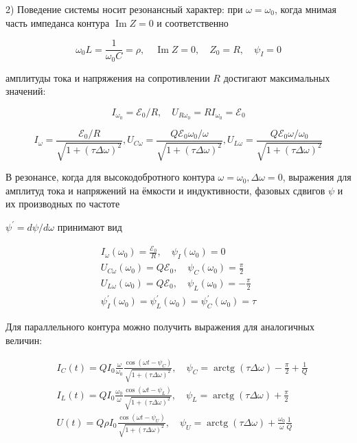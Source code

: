 \documentclass[a4paper, 12pt]{article}%
\begin{document}
2) Поведение системы носит резонансный характер: при $\omega=\omega_{0}$, когда мнимая часть импеданса контура $\operatorname{Im} Z=0$ и соответственно

\[
\omega_{0} L=\frac{1}{\omega_{0} C}=\rho, \quad \operatorname{Im} Z=0, \quad Z_{0}=R, \quad \psi_{I}=0
\]

амплитуды тока и напряжения на сопротивлении $R$ достигают максимальных значений:

\[
I_{\omega_{0}}=\mathcal{E}_{0} / R, \quad U_{R \omega_{0}}=R I_{\omega_{0}}=\mathcal{E}_{0}
\]

\[
I_{\omega}=\frac{\mathcal{E}_{0} / R}{\sqrt{1+(\tau \Delta \omega)^{2}}}, U_{C \omega}=\frac{Q \mathcal{E}_{0} \omega_{0} / \omega}{\sqrt{1+(\tau \Delta \omega)^{2}}}, U_{L \omega}=\frac{Q \mathcal{E}_{0} \omega / \omega_{0}}{\sqrt{1+(\tau \Delta \omega)^{2}}}
\]

В резонансе, когда для высокодобротного контура $\omega=\omega_{0}, \Delta \omega=0$, выражения для амплитуд тока и напряжений на ёмкости и индуктивности, фазовых сдвигов $\psi$ и их производных по частоте 

$\psi^{\prime}=d \psi / d \omega$ принимают вид

\[
\begin{gathered}
I_{\omega}\left(\omega_{0}\right)=\frac{\mathcal{E}_{0}}{R}, \quad \psi_{I}\left(\omega_{0}\right)=0 \\
U_{C \omega}\left(\omega_{0}\right)=Q \mathcal{E}_{0}, \quad \psi_{C}\left(\omega_{0}\right)=\frac{\pi}{2} \\
U_{L \omega}\left(\omega_{0}\right)=Q \mathcal{E}_{0}, \quad \psi_{L}\left(\omega_{0}\right)=-\frac{\pi}{2} \\
\psi_{I}^{\prime}\left(\omega_{0}\right)=\psi_{L}^{\prime}\left(\omega_{0}\right)=\psi_{C}^{\prime}\left(\omega_{0}\right)=\tau
\end{gathered}
\]

Для параллельного контура можно получить выражения для аналогичных величин:

\[
\begin{aligned}
&I_{C}(t)=Q I_{0} \frac{\omega}{\omega_{0}} \frac{\cos \left(\omega t-\psi_{C}\right)}{\sqrt{1+(\tau \Delta \omega)^{2}}}, \quad \psi_{C}=\operatorname{arctg}(\tau \Delta \omega)-\frac{\pi}{2}+\frac{1}{Q} \\
&I_{L}(t)=Q I_{0} \frac{\omega_{0}}{\omega} \frac{\cos \left(\omega t-\psi_{L}\right)}{\sqrt{1+(\tau \Delta \omega)^{2}}}, \quad \psi_{L}=\operatorname{arctg}(\tau \Delta \omega)+\frac{\pi}{2} \\
&U(t)=Q \rho I_{0} \frac{\cos \left(\omega t-\psi_{U}\right)}{\sqrt{1+(\tau \Delta \omega)^{2}}}, \quad \psi_{U}=\operatorname{arctg}(\tau \Delta \omega)+\frac{\omega_{0}}{\omega} \frac{1}{Q}
\end{aligned}
\]
\end{document}
